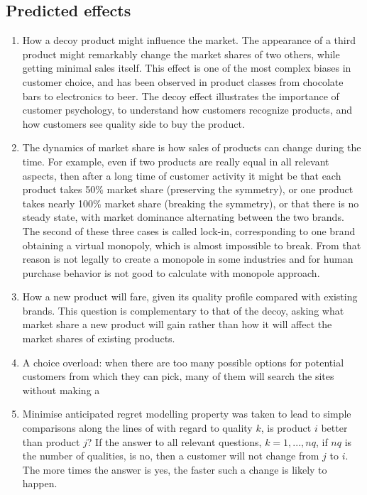 \subsection{Predicted effects} \label{subsec:predicted}
\begin{enumerate}
	\item How a decoy product might influence the market.
	The appearance of a third product might remarkably change the market shares of two others, while getting minimal sales itself.
	This effect is one of the most complex biases in customer choice, and has been observed in product classes from chocolate bars to electronics to beer.
	The decoy effect illustrates the importance of customer psychology, to understand how customers recognize products, and how customers see quality side to buy the product.

	\item The dynamics of market share is how sales of products can change during the time.
	For example, even if two products are really equal in all relevant aspects, then after a long time of customer
	activity it might be that each product takes 50\% market share (preserving the symmetry), or one product takes
	nearly 100\% market share (breaking the symmetry), or that there is no steady state, with market dominance alternating between the two brands.
	The second of these three cases is called lock-in, corresponding to one brand obtaining a virtual monopoly, which is almost impossible to break.
	From that reason is not legally to create a monopole in some industries and for human purchase behavior is not good to calculate with monopole approach.

	\item How a new product will fare, given its quality profile compared with existing brands.
	This question is complementary to that of the decoy, asking what market share a new product will gain rather than how it will affect the market shares of existing products.

	\item A choice overload: when there are too many possible options for potential customers from which they can pick,
	many of them will search the sites without making a
	\item Minimise anticipated regret modelling property was taken to lead to simple comparisons along the lines of with regard to quality $k$,
	is product $i$ better than product $j$?
	If the answer to all relevant questions, $k = 1, . . . , nq$, if $nq$ is the number of qualities, is no, then a customer
	will not change from $j$ to $i$.
	The more times the answer is yes, the faster such a change is likely to happen.
\end{enumerate}
\\
